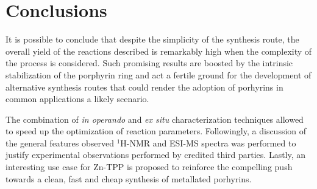 \documentclass[twoside,twocolumn,9pt]{article}
\begin{document}
\section{Conclusions}
It is possible to conclude that despite the simplicity of the synthesis route, the overall yield of the reactions described is remarkably high when the complexity of the process is considered.
Such promising results are boosted by the intrinsic stabilization of the porphyrin ring and act a fertile ground for the development of alternative synthesis routes that could render the adoption of porhyrins in common applications a likely scenario.

The combination of \textit{in operando} and \textit{ex situ} characterization techniques allowed to speed up the optimization of reaction parameters.
Followingly, a discussion of the general features observed $^{1}$H-NMR and ESI-MS spectra was performed to justify experimental observations performed by credited third parties.
Lastly, an interesting use case for Zn-TPP is proposed to reinforce the compelling push towards a clean, fast and cheap synthesis of metallated porhyrins.
\end{document}

